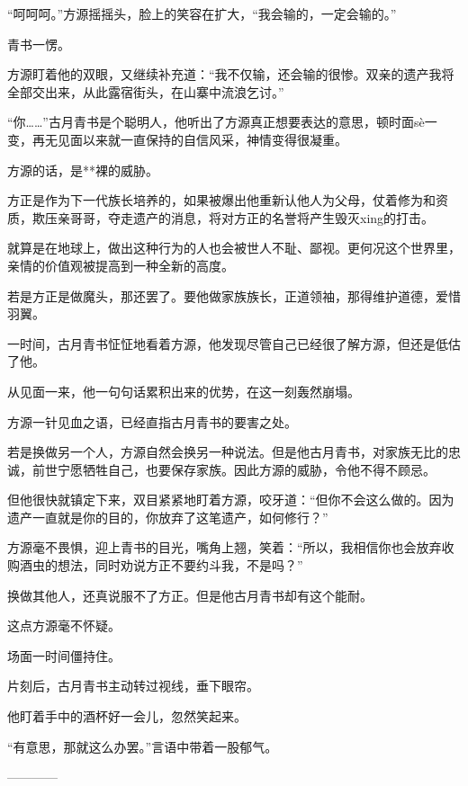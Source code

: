 \begin{this_body}
“呵呵呵。”方源摇摇头，脸上的笑容在扩大，“我会输的，一定会输的。”

青书一愣。

方源盯着他的双眼，又继续补充道：“我不仅输，还会输的很惨。双亲的遗产我将全部交出来，从此露宿街头，在山寨中流浪乞讨。”

“你……”古月青书是个聪明人，他听出了方源真正想要表达的意思，顿时面sè一变，再无见面以来就一直保持的自信风采，神情变得很凝重。

方源的话，是**裸的威胁。

方正是作为下一代族长培养的，如果被爆出他重新认他人为父母，仗着修为和资质，欺压亲哥哥，夺走遗产的消息，将对方正的名誉将产生毁灭xing的打击。

就算是在地球上，做出这种行为的人也会被世人不耻、鄙视。更何况这个世界里，亲情的价值观被提高到一种全新的高度。

若是方正是做魔头，那还罢了。要他做家族族长，正道领袖，那得维护道德，爱惜羽翼。

一时间，古月青书怔怔地看着方源，他发现尽管自己已经很了解方源，但还是低估了他。

从见面一来，他一句句话累积出来的优势，在这一刻轰然崩塌。

方源一针见血之语，已经直指古月青书的要害之处。

若是换做另一个人，方源自然会换另一种说法。但是他古月青书，对家族无比的忠诚，前世宁愿牺牲自己，也要保存家族。因此方源的威胁，令他不得不顾忌。

但他很快就镇定下来，双目紧紧地盯着方源，咬牙道：“但你不会这么做的。因为遗产一直就是你的目的，你放弃了这笔遗产，如何修行？”

方源毫不畏惧，迎上青书的目光，嘴角上翘，笑着：“所以，我相信你也会放弃收购酒虫的想法，同时劝说方正不要约斗我，不是吗？”

换做其他人，还真说服不了方正。但是他古月青书却有这个能耐。

这点方源毫不怀疑。

场面一时间僵持住。

片刻后，古月青书主动转过视线，垂下眼帘。

他盯着手中的酒杯好一会儿，忽然笑起来。

“有意思，那就这么办罢。”言语中带着一股郁气。

------------

\end{this_body}

